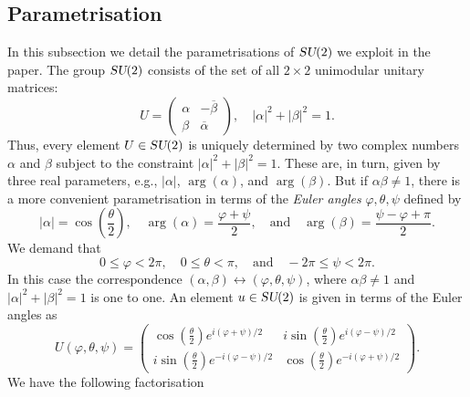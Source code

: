 \documentclass[12pt]{amsart}
\def\su2{\textsl{SU}(2)}
\theoremstyle{definition}
\theoremstyle{remark}
\numberwithin{equation}{section}
\begin{document}
\subsection{Parametrisation}
In this subsection we detail the parametrisations of $\su2$ we exploit in the paper. The group $\su2$ consists of the set of all $2\times 2$ unimodular unitary matrices:
\begin{equation}
	U = \begin{pmatrix} \alpha & -\overline{\beta} \\ \beta & \overline{\alpha}\end{pmatrix}, \quad |\alpha|^2 + |\beta|^2 = 1.
\end{equation}
Thus, every element $U\in \su2$ is uniquely determined by two complex numbers $\alpha$ and $\beta$ subject to the constraint $|\alpha|^2 + |\beta|^2 = 1$. These are, in turn, given by three real parameters, e.g., $|\alpha|$, $\arg(\alpha)$, and $\arg(\beta)$. But if $\alpha\beta \not=1$, there is a more convenient parametrisation in terms of the \emph{Euler angles} $\varphi, \theta, \psi$ defined by
\begin{equation}
	|\alpha| = \cos\left(\frac{\theta}{2}\right), \quad \arg(\alpha) = \frac{\varphi +\psi}{2}, \quad \text{and} \quad  \arg(\beta) = \frac{\psi-\varphi + \pi}{2}.
\end{equation}
We demand that
\begin{equation}
	0\le \varphi < 2\pi, \quad 0\le \theta < \pi, \quad \text{and} \quad -2\pi \le \psi < 2\pi.
\end{equation}
In this case the correspondence $(\alpha, \beta) \leftrightarrow (\varphi, \theta, \psi)$, where $\alpha\beta \not=1$ and $|\alpha|^2 + |\beta|^2 = 1$ is one to one. An element $u\in \su2$ is given in terms of the Euler angles as
\begin{equation}
	U(\varphi, \theta, \psi) = \begin{pmatrix} \cos\left(\frac{\theta}{2}\right)e^{i(\varphi+\psi)/2} &  i\sin\left(\frac{\theta}{2}\right)e^{i(\varphi-\psi)/2}\\ i\sin\left(\frac{\theta}{2}\right)e^{-i(\varphi-\psi)/2} & \cos\left(\frac{\theta}{2}\right)e^{-i(\varphi+\psi)/2}\end{pmatrix}.
\end{equation}
We have the following factorisation 
\end{document}
